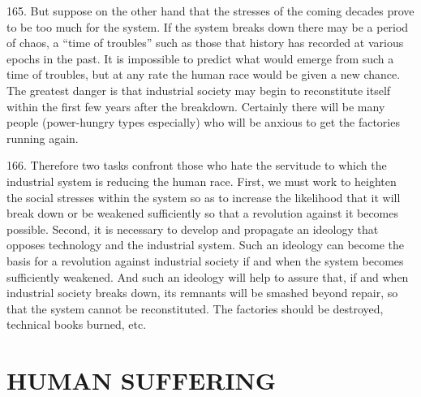 \documentclass{article}
\begin{document}
165. But suppose on the other hand that the stresses of the coming decades prove to be too much 
for the system. If the system breaks down there may be a period of chaos, a “time of troubles” 
such as those that history has recorded at various epochs in the past. It is impossible to predict 
what would emerge from such a time of troubles, but at any rate the human race would be given a 
new chance. The greatest danger is that industrial society may begin to reconstitute itself within 
the first few years after the breakdown. Certainly there will be many people (power-hungry types 
especially) who will be anxious to get the factories running again. \vspace{\baselineskip}

166. Therefore two tasks confront those who hate the servitude to which the industrial system is 
reducing the human race. First, we must work to heighten the social stresses within the system so 
as to increase the likelihood that it will break down or be weakened sufficiently so that a revolution 
against it becomes possible. Second, it is necessary to develop and propagate an ideology that 
opposes technology and the industrial system. Such an ideology can become the basis for a 
revolution against industrial society if and when the system becomes sufficiently weakened. And 
such an ideology will help to assure that, if and when industrial society breaks down, its remnants 
will be smashed beyond repair, so that the system cannot be reconstituted. The factories should 
be destroyed, technical books burned, etc. 


\section{HUMAN SUFFERING}
\end{document}
